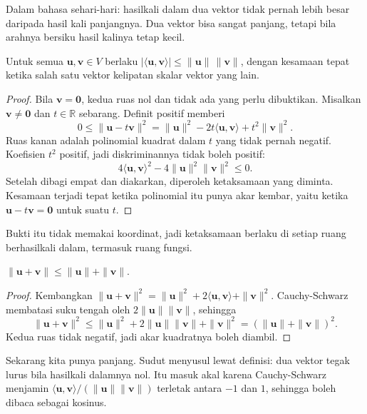 Dalam bahasa sehari-hari: hasilkali dalam dua vektor tidak pernah lebih besar daripada
hasil kali panjangnya. Dua vektor bisa sangat panjang, tetapi bila arahnya bersiku hasil
kalinya tetap kecil.

\begin{teorema}
Untuk semua $\mathbf{u},\mathbf{v}\in V$ berlaku
$|\langle\mathbf{u},\mathbf{v}\rangle|\le\|\mathbf{u}\|\,\|\mathbf{v}\|$, dengan
kesamaan tepat ketika salah satu vektor kelipatan skalar vektor yang lain.
\end{teorema}

\begin{proof}
Bila $\mathbf{v}=\mathbf{0}$, kedua ruas nol dan tidak ada yang perlu dibuktikan.
Misalkan $\mathbf{v}\ne\mathbf{0}$ dan $t\in\mathbb{R}$ sebarang. Definit positif
memberi
\[
  0\le\|\mathbf{u}-t\mathbf{v}\|^{2}
   =\|\mathbf{u}\|^{2}-2t\langle\mathbf{u},\mathbf{v}\rangle+t^{2}\|\mathbf{v}\|^{2}.
\]
Ruas kanan adalah polinomial kuadrat dalam $t$ yang tidak pernah negatif. Koefisien
$t^{2}$ positif, jadi diskriminannya tidak boleh positif:
\[
  4\langle\mathbf{u},\mathbf{v}\rangle^{2}-4\|\mathbf{u}\|^{2}\|\mathbf{v}\|^{2}\le0 .
\]
Setelah dibagi empat dan diakarkan, diperoleh ketaksamaan yang diminta. Kesamaan
terjadi tepat ketika polinomial itu punya akar kembar, yaitu ketika
$\mathbf{u}-t\mathbf{v}=\mathbf{0}$ untuk suatu $t$.
\end{proof}

Bukti itu tidak memakai koordinat, jadi ketaksamaan berlaku di setiap ruang
berhasilkali dalam, termasuk ruang fungsi.

\begin{akibat}
$\|\mathbf{u}+\mathbf{v}\|\le\|\mathbf{u}\|+\|\mathbf{v}\|$.
\end{akibat}

\begin{proof}
Kembangkan $\|\mathbf{u}+\mathbf{v}\|^{2}
=\|\mathbf{u}\|^{2}+2\langle\mathbf{u},\mathbf{v}\rangle+\|\mathbf{v}\|^{2}$.
Cauchy-Schwarz membatasi suku tengah oleh $2\|\mathbf{u}\|\|\mathbf{v}\|$, sehingga
\[
  \|\mathbf{u}+\mathbf{v}\|^{2}\le\|\mathbf{u}\|^{2}+2\|\mathbf{u}\|\|\mathbf{v}\|
  +\|\mathbf{v}\|^{2}=(\|\mathbf{u}\|+\|\mathbf{v}\|)^{2}.
\]
Kedua ruas tidak negatif, jadi akar kuadratnya boleh diambil.
\end{proof}

Sekarang kita punya panjang. Sudut menyusul lewat definisi: dua vektor tegak lurus bila
hasilkali dalamnya nol. Itu masuk akal karena Cauchy-Schwarz menjamin
$\langle\mathbf{u},\mathbf{v}\rangle/(\|\mathbf{u}\|\|\mathbf{v}\|)$ terletak antara $-1$
dan $1$, sehingga boleh dibaca sebagai kosinus.

